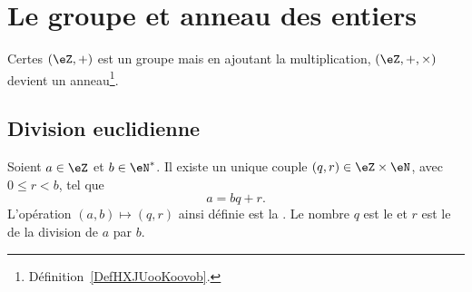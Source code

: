 
\section{Le groupe et anneau des entiers}

Certes \( (\eZ,+)\) est un groupe mais en ajoutant la multiplication, \( (\eZ,+,\times)\) devient un anneau\footnote{Définition~\ref{DefHXJUooKoovob}.}.

\subsection{Division euclidienne}

\begin{theoremDef}     \label{ThoDivisEuclide}
	Soient \( a\in\eZ\) et \( b\in\eN^*\). Il existe un unique couple \( (q,r)\in\eZ\times\eN\), avec \( 0\leq r<b\), tel que
	\begin{equation}
		a=bq+r.
	\end{equation}
	L'opération \( (a,b)\mapsto(q,r)\) ainsi définie est la . Le nombre \( q\) est le  et \( r\) est le  de la division de \( a\) par \( b\).
\end{theoremDef}

